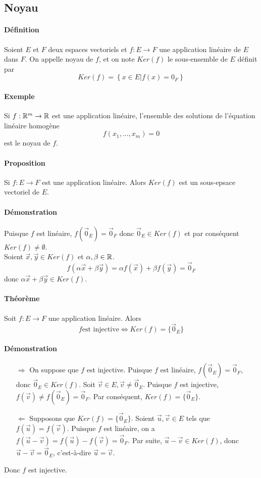 %
\subsection{Noyau}
%
\paragraph{Définition} Soient $E$ et $F$ deux espaces vectoriels et $f: E \rightarrow F$ une application linéaire de $E$ dans $F$. On appelle noyau de $f$, et on note $Ker(f)$ le sous-ensemble de $E$ définit par
$$Ker(f) = \left\{ x\in E \vert f(x) = 0_F \right\}$$

\paragraph{Exemple} Si $f: \mathbb{R}^m \rightarrow \mathbb{R}$ est une application linéaire, l'ensemble des solutions de l'équation linéaire homogène
$$f(x_1, \ldots, x_m) = 0$$
est le noyau de $f$.

\paragraph{Proposition} Si $f: E \rightarrow F$ est une application linéaire. Alors $Ker(f)$ est un sous-epsace vectoriel de $E$.

\paragraph{Démonstration} Puisque $f$ est linéaire, $f(\vec{0}_E) = \vec{0}_F$ donc $\vec{0}_E \in Ker(f)$ et par conséquent $Ker(f) \neq \emptyset$. \\
Soient $\vec{x}, \vec{y} \in Ker(f)$ et $\alpha, \beta \in \mathbb{R}$.
$$f(\alpha \vec{x} + \beta \vec{y}) = \alpha f(\vec{x}) + \beta f(\vec{y}) = \vec{0}_F$$
donc $\alpha \vec{x} + \beta \vec{y} \in Ker(f)$.

\paragraph{Théorème} Soit $f: E \rightarrow F$ une application linéaire. Alors
$$f \text{est injective} \Leftrightarrow Ker(f) = \{\vec{0}_E\}$$
\paragraph{Démonstration} 
\begin{itemize}
  \item[$\Rightarrow$] On suppose que $f$ est injective. Puisque $f$ est linéaire, $f(\vec{0}_E) = \vec{0}_F$, donc $\vec{0}_E \in Ker(f)$. Soit $\vec{v} \in E, \vec{v}\neq \vec{0}_E$. Puisque $f$ est injective, $f(\vec{v}) \neq f(\vec{0}_E) = \vec{0}_F$. Par conséquent, $Ker(f) = \{\vec{0}_E\}$.
  \item[$\Leftarrow$] Supposons que $Ker(f) = \{\vec{0}_E\}$. Soient $\vec{u}, \vec{v} \in E$ tels que $f(\vec{u}) = f(\vec{v})$. Puisque $f$ est linéaire, on a $f(\vec{u} - \vec{v}) = f(\vec{u}) - f(\vec{v}) = \vec{0}_F$. Par suite, $\vec{u} - \vec{v} \in Ker(f)$, donc $\vec{u}-\vec{v} = \vec{0}_E$, c'est-à-dire $\vec{u} = \vec{v}$.
\end{itemize}
Donc $f$ est injective.

